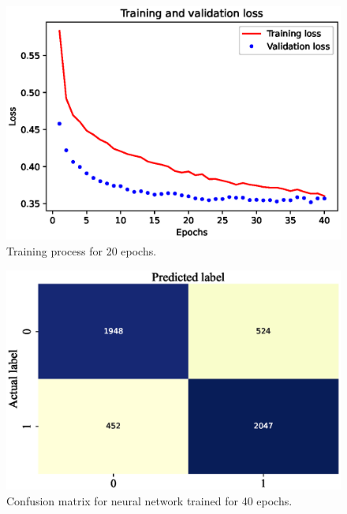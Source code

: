 \documentclass[11pt, a4paper, jou]{apa7}
\begin{document}
\begin{figure}[p]
    \centering
    \caption{Training process for 20 epochs. }\label{fig:nn_40}
    \includegraphics[width=.45\textwidth]{figures/error_40.eps}
\end{figure}


\begin{figure}[p]
    \centering
    \caption{Confusion matrix for neural network trained for 40 epochs. }\label{fig:nn_cm}
    \includegraphics[width=.45\textwidth]{figures/nn_cm.eps}
\end{figure}

\begin{table}[p]
    \centering
    \caption{Classification results of neural network on the test set. }\label{tab:nn_summary}
\end{table}
\end{document}
